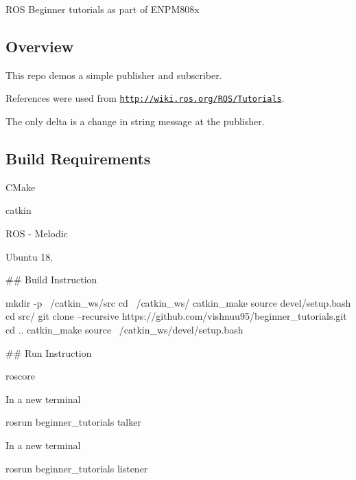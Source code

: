 R\+OS Beginner tutorials as part of E\+N\+P\+M808x

\subsection*{Overview}


\begin{DoxyItemize}
\item This repo demos a simple publisher and subscriber.
\item References were used from \href{http://wiki.ros.org/ROS/Tutorials}{\tt http\+://wiki.\+ros.\+org/\+R\+O\+S/\+Tutorials}.
\item The only delta is a change in string message at the publisher.
\end{DoxyItemize}

\subsection*{Build Requirements}


\begin{DoxyItemize}
\item C\+Make
\item catkin
\item R\+OS -\/ Melodic
\item Ubuntu 18.
\end{DoxyItemize}

\#\# Build Instruction 
\begin{DoxyCode}
mkdir -p ~/catkin\_ws/src
cd ~/catkin\_ws/
catkin\_make
source devel/setup.bash
cd src/
git clone --recursive https://github.com/vishnuu95/beginner\_tutorials.git
cd ..
catkin\_make
source ~/catkin\_ws/devel/setup.bash
\end{DoxyCode}


\#\# Run Instruction 
\begin{DoxyCode}
roscore
\end{DoxyCode}
 In a new terminal 
\begin{DoxyCode}
rosrun beginner\_tutorials talker
\end{DoxyCode}
 In a new terminal 
\begin{DoxyCode}
rosrun beginner\_tutorials listener
\end{DoxyCode}
 